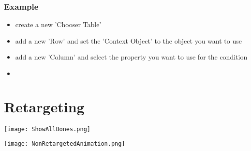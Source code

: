             \subsubsection{Example}
                \begin{itemize}
                    \item create a new 'Chooser Table'
                    \item add a new 'Row' and set the 'Context Object' to the object you want to use
                    \item add a new 'Column' and select the property you want to use for the condition
                    \item 
                \end{itemize}

    \section{Retargeting}
        \begin{minipage}{0.9\textwidth}
            \begingroup \parfillskip=0pt
                \begin{minipage}[t]{0.49\textwidth}
                    \texttt{[image: ShowAllBones.png]}

                    \label{}
                \end{minipage}
                \begin{minipage}[t]{0.49\textwidth}
                    \texttt{[image: NonRetargetedAnimation.png]}

                    \label{}
                \end{minipage}
            \par\endgroup
        \end{minipage}
        
